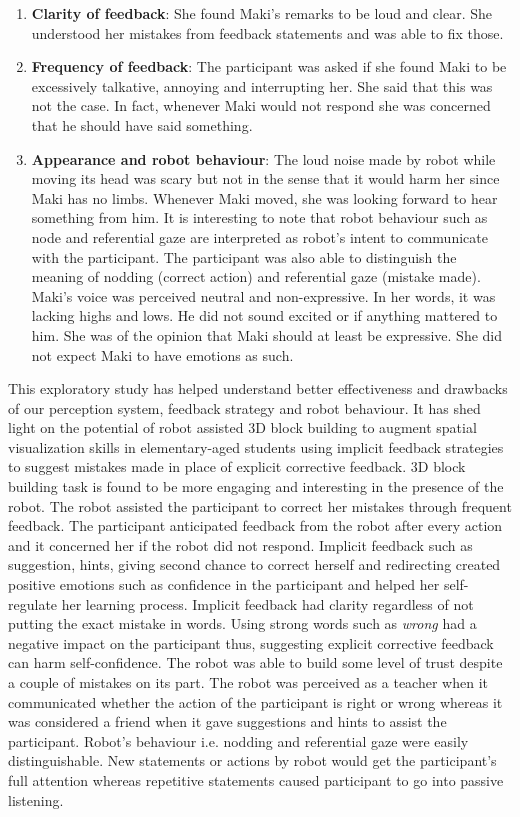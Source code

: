 \begin{enumerate}
    \item \textbf{Clarity of feedback}: She found Maki's remarks to be loud and clear. She understood her mistakes from feedback statements and was able to fix those.
    \item \textbf{Frequency of feedback}: The participant was asked if she found Maki to be excessively talkative, annoying and interrupting her. She said that this was not the case. In fact, whenever Maki would not respond she was concerned that he should have said something. 
    \item \textbf{Appearance and robot behaviour}: The loud noise made by robot while moving its head was scary but not in the sense that it would harm her since Maki has no limbs. Whenever Maki moved, she was looking forward to hear something from him. It is interesting to note that robot behaviour such as node and referential gaze are interpreted as robot's intent to communicate with the participant. The participant was also able to distinguish the meaning of nodding (correct action) and referential gaze (mistake made). Maki's voice was perceived neutral and non-expressive. In her words, it was lacking highs and lows. He did not sound excited or if anything mattered to him. She was of the opinion that Maki should at least be expressive. She did not expect Maki to have emotions as such. 
\end{enumerate}
This exploratory study has helped understand better effectiveness and drawbacks of our perception system, feedback strategy and robot behaviour. It has shed light on the potential of robot assisted 3D block building to augment spatial visualization skills in elementary-aged students using implicit feedback strategies to suggest mistakes made in place of explicit corrective feedback. 3D block building task is found to be more engaging and interesting in the presence of the robot. The robot assisted the participant to correct her mistakes through frequent feedback. The participant anticipated feedback from the robot after every action and it concerned her if the robot did not respond. Implicit feedback such as suggestion, hints, giving second chance to correct herself and redirecting created positive emotions such as confidence in the participant and helped her self-regulate her learning process. Implicit feedback had clarity regardless of not putting the exact mistake in words. Using strong words such as \emph{wrong} had a negative impact on the participant thus, suggesting explicit corrective feedback can harm self-confidence. The robot was able to build some level of trust despite a couple of mistakes on its part. The robot was perceived as a teacher when it communicated whether the action of the participant is right or wrong whereas it was considered a friend when it gave suggestions and hints to assist the participant. Robot's behaviour i.e. nodding and referential gaze were easily distinguishable. New statements or actions by robot would get the participant's full attention whereas repetitive statements caused participant to go into passive listening.\\
